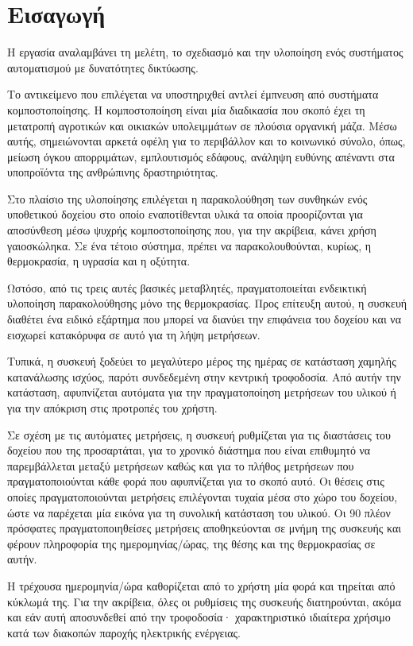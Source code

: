\chapter{Εισαγωγή}

Η εργασία αναλαμβάνει τη μελέτη, το σχεδιασμό και την υλοποίηση ενός συστήματος
αυτοματισμού με δυνατότητες δικτύωσης.

Το αντικείμενο που επιλέγεται να υποστηριχθεί αντλεί έμπνευση από συστήματα
κομποστοποίησης. Η κομποστοποίηση είναι μία διαδικασία που σκοπό έχει τη
μετατροπή αγροτικών και οικιακών υπολειμμάτων σε πλούσια οργανική μάζα.
Μέσω αυτής, σημειώνονται αρκετά οφέλη για το περιβάλλον και το κοινωνικό σύνολο,
όπως, μείωση όγκου απορριμάτων, εμπλουτισμός εδάφους, ανάληψη ευθύνης απέναντι
στα υποπροϊόντα της ανθρώπινης δραστηριότητας.

Στο πλαίσιο της υλοποίησης επιλέγεται η παρακολούθηση των συνθηκών ενός
υποθετικού δοχείου στο οποίο εναποτίθενται υλικά τα οποία προορίζονται για
αποσύνθεση μέσω ψυχρής κομποστοποίησης που, για την ακρίβεια, κάνει χρήση
γαιοσκώληκα. Σε ένα τέτοιο σύστημα, πρέπει να παρακολουθούνται, κυρίως, η
θερμοκρασία, η υγρασία και η οξύτητα.

Ωστόσο, από τις τρεις αυτές βασικές μεταβλητές, πραγματοποιείται ενδεικτική
υλοποίηση παρακολούθησης μόνο της θερμοκρασίας. Προς επίτευξη αυτού, η συσκευή
διαθέτει ένα ειδικό εξάρτημα που μπορεί να διανύει την επιφάνεια του δοχείου
και να εισχωρεί κατακόρυφα σε αυτό για τη λήψη μετρήσεων.

Τυπικά, η συσκευή ξοδεύει το μεγαλύτερο μέρος της ημέρας σε κατάσταση χαμηλής
κατανάλωσης ισχύος, παρότι συνδεδεμένη στην κεντρική τροφοδοσία. Από αυτήν την
κατάσταση, αφυπνίζεται αυτόματα για την πραγματοποίηση μετρήσεων του υλικού ή
για την απόκριση στις προτροπές του χρήστη.

Σε σχέση με τις αυτόματες μετρήσεις, η συσκευή ρυθμίζεται για τις διαστάσεις του
δοχείου που της προσαρτάται, για το χρονικό διάστημα που είναι επιθυμητό να
παρεμβάλλεται μεταξύ μετρήσεων καθώς και για το πλήθος μετρήσεων που
πραγματοποιούνται κάθε φορά που αφυπνίζεται για το σκοπό αυτό.
Οι θέσεις στις οποίες πραγματοποιούνται μετρήσεις επιλέγονται τυχαία μέσα στο
χώρο του δοχείου, ώστε να παρέχεται μία εικόνα για τη συνολική κατάσταση του
υλικού. Οι 90 πλέον πρόσφατες πραγματοποιηθείσες μετρήσεις αποθηκεύονται σε
μνήμη της συσκευής και φέρουν πληροφορία της ημερομηνίας\slash{}ώρας, της θέσης
και της θερμοκρασίας σε αυτήν.

Η τρέχουσα ημερομηνία\slash{}ώρα καθορίζεται από το χρήστη μία φορά και τηρείται
από κύκλωμά της. Για την ακρίβεια, όλες οι ρυθμίσεις της συσκευής διατηρούνται,
ακόμα και εάν αυτή αποσυνδεθεί από την τροφοδοσία· χαρακτηριστικό ιδιαίτερα
χρήσιμο κατά των διακοπών παροχής ηλεκτρικής ενέργειας.

